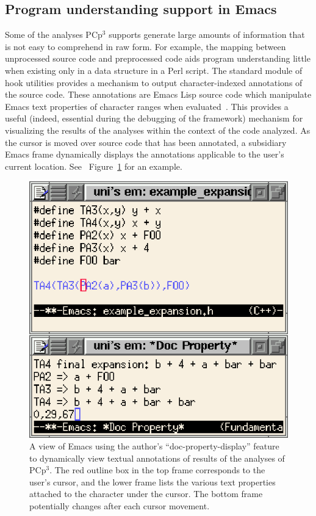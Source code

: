 \documentclass{article}
\newcommand{\pcp}{\mbox{\textsf{PCp}$^3$}}
\newcommand{\Perl}{\mbox{\textsf{Perl}}}
\newcommand{\figref}[1]{Figure~\ref{#1}}
\begin{document}
\subsection{Program understanding support in Emacs}
Some of the analyses \pcp{} supports generate large amounts of
information that is not easy to comprehend in raw form.  For example,
the mapping between unprocessed source code and preprocessed code aids
program understanding little when existing only in a data structure in a
\Perl{} script.  The standard module of hook utilities provides a
mechanism to output character-indexed annotations of the source code.
These annotations are Emacs Lisp source code which manipulate Emacs text
properties of character ranges when evaluated~\cite{GNUELisp}.  This provides a useful
(indeed, essential during the debugging of the framework) mechanism for visualizing the
results of the analyses within the context of the code analyzed.  As the
cursor is moved over source code that has been annotated, a subsidiary
Emacs frame dynamically displays the annotations applicable to the
user's current location. See ~\figref{fig:emacsdocprop} for an
example.

\begin{figure}[htbp]
  \begin{center}
    \leavevmode
    \includegraphics{figs/doc-prop.ps}
    \caption{A view of Emacs using the author's ``doc-property-display''
      feature to dynamically view textual annotations of results of the
      analyses of \pcp{}.  The red outline box in the top frame
      corresponds to the user's cursor, and the lower frame lists the
      various text properties attached to the character under the
      cursor.  The bottom frame potentially changes after each cursor movement.}
    \label{fig:emacsdocprop}
  \end{center}
\end{figure}
\end{document}
